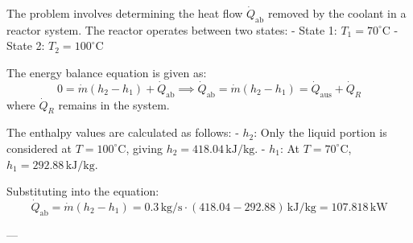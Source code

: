 The problem involves determining the heat flow \( \dot{Q}_{\text{ab}} \) removed by the coolant in a reactor system. The reactor operates between two states:  
- State 1: \( T_1 = 70^\circ\text{C} \)  
- State 2: \( T_2 = 100^\circ\text{C} \)  

The energy balance equation is given as:  
\[
0 = \dot{m}(h_2 - h_1) + \dot{Q}_{\text{ab}} \implies \dot{Q}_{\text{ab}} = \dot{m}(h_2 - h_1) = \dot{Q}_{\text{aus}} + \dot{Q}_R
\]  
where \( \dot{Q}_R \) remains in the system.  

The enthalpy values are calculated as follows:  
- \( h_2 \): Only the liquid portion is considered at \( T = 100^\circ\text{C} \), giving \( h_2 = 418.04 \, \text{kJ/kg} \).  
- \( h_1 \): At \( T = 70^\circ\text{C} \), \( h_1 = 292.88 \, \text{kJ/kg} \).  

Substituting into the equation:  
\[
\dot{Q}_{\text{ab}} = \dot{m}(h_2 - h_1) = 0.3 \, \text{kg/s} \cdot (418.04 - 292.88) \, \text{kJ/kg} = 107.818 \, \text{kW}
\]  

---